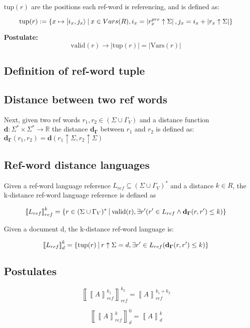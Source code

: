 \documentclass{article}
\newcommand{\abs}[1]{\left|#1\right|}
\newcommand{\set}[1]{\left\{#1\right\}}
\newcommand{\st}{\ \vline \ }
\newcommand{\dbrack}[1]{\left\llbracket#1\right\rrbracket}
\begin{document}
$\mathrm{tup}(r)$ are the positions each ref-word is referencing, and is defined as:

\begin{equation}
    \mathrm{tup}(r) := \set{x \mapsto [i_x, j_x\rangle \st x \in Vars(R), i_x = \abs{r_x^{pre} \uparrow \Sigma}, j_x = i_x + \abs{r_x \uparrow \Sigma}}
\end{equation}

\textbf{Postulate:} 
\begin{equation}
    \mathrm{valid}(r) \rightarrow \abs{\mathrm{tup}(r)} = \abs{\mathrm{Vars}(r)}
\end{equation}
\subsection*{Definition of ref-word tuple}

\subsection*{Distance between two ref words}


Next, given two ref words $r_1, r_2 \in (\Sigma \cup \Gamma_V)$ and
a distance function 
$\mathbf{d} : \Sigma^* \times \Sigma^* \rightarrow \mathbb{R}$
the distance $\mathbf{d_\Gamma}$ between $r_1$ and $r_2$
is defined as: $\mathbf{d_\Gamma}(r_1, r_2) = \mathbf{d}(r_1 \uparrow
\Sigma, r_2 \uparrow \Sigma)$

\subsection*{Ref-word distance languages}

Given a ref-word language reference $L_{ref} \subseteq (\Sigma\cup\Gamma_V)^*$ and a distance $k \in R$, the k-distance ref-word language reference is defined as

\begin{equation}
    \dbrack{L_{ref}}^k_{ref} = \set{r \in (\Sigma \cup \Gamma_V)^* \st  \mathrm{valid(r)}, \exists r' (r'\in L_{ref} \land \mathbf{d_\Gamma}(r, r') \leq k)}
\end{equation}

Given a document d, the k-distance ref-word language is:

\begin{equation}
    \dbrack{L_{ref}}^k_d = \set{\mathrm{tup}(r) \st r\uparrow \Sigma = d, \exists r' \in L_{ref} ( \mathbf{d_{\Gamma}}(r, r') \leq k)}
\end{equation}

\subsection*{Postulates}

\begin{equation}
    \dbrack{\dbrack{A}_{ref}^{k_1}}_{ref}^{k_2} = \dbrack{A}_{ref}^{k_1 + k_2}
\end{equation}

\begin{equation}
    \dbrack{\dbrack{A}^{k}_{ref}}^{0}_d = \dbrack{A}^k_d
\end{equation}
\end{document}
